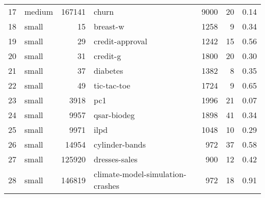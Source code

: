 \begin{tabular}{rlrlrrr}
    17 & medium &   167141 &                            churn &        9000 &         20 &           0.14 \\
    18 &  small &       15 &                         breast-w &        1258 &          9 &           0.34 \\
    19 &  small &       29 &                  credit-approval &        1242 &         15 &           0.56 \\
    20 &  small &       31 &                         credit-g &        1800 &         20 &           0.30 \\
    21 &  small &       37 &                         diabetes &        1382 &          8 &           0.35 \\
    22 &  small &       49 &                      tic-tac-toe &        1724 &          9 &           0.65 \\
    23 &  small &     3918 &                              pc1 &        1996 &         21 &           0.07 \\
    24 &  small &     9957 &                      qsar-biodeg &        1898 &         41 &           0.34 \\
    25 &  small &     9971 &                             ilpd &        1048 &         10 &           0.29 \\
    26 &  small &    14954 &                   cylinder-bands &         972 &         37 &           0.58 \\
    27 &  small &   125920 &                    dresses-sales &         900 &         12 &           0.42 \\
    28 &  small &   146819 & climate-model-simulation-crashes &         972 &         18 &           0.91 \\
\bottomrule
\end{tabular}
